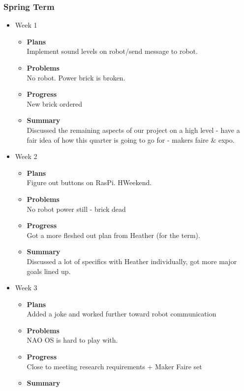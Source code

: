 	\subsubsection{Spring Term}
	\begin{itemize}
		\item{Week 1}
			\begin{itemize}
				\item \textbf{Plans} \\
				Implement sound levels on robot/send message to robot.
				\item \textbf{Problems} \\
				No robot. Power brick is broken.
				\item \textbf{Progress} \\
				New brick ordered
				\item \textbf{Summary} \\
				Discussed the remaining aspects of our project on a high level - have a fair idea of how this quarter is going to go for - makers faire \& expo.
			\end{itemize}
		\item{Week 2}
			\begin{itemize}
				\item \textbf{Plans} \\
				Figure out buttons on RasPi. HWeekend.
				\item \textbf{Problems} \\
				No robot power still - brick dead
				\item \textbf{Progress} \\
				Got a more fleshed out plan from Heather (for the term).
				\item \textbf{Summary} \\
				Discussed a lot of specifics with Heather individually, got more major goals lined up.
			\end{itemize}
		\item{Week 3}
			\begin{itemize}
				\item \textbf{Plans} \\
				Added a joke and worked further toward robot communication
				\item \textbf{Problems} \\
				NAO OS is hard to play with.
				\item \textbf{Progress} \\
				Close to meeting research requirements + Maker Faire set
				\item \textbf{Summary} \\

\end{itemize}
\end{itemize}
